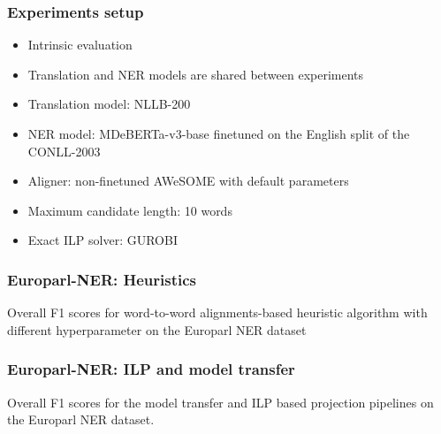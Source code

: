 \documentclass{beamer}
\begin{document}
\begin{frame}
  \frametitle{Experiments setup}

  \begin{itemize}
    \item Intrinsic evaluation
    \item Translation and NER models are shared between experiments
    \item Translation model: NLLB-200
    \item NER model: MDeBERTa-v3-base finetuned on the English split of the CONLL-2003
    \item Aligner: non-finetuned AWeSOME with default parameters
    \item Maximum candidate length: 10 words
    \item Exact ILP solver: GUROBI
  \end{itemize}
\end{frame}

\begin{frame}
  \frametitle{Europarl-NER: Heuristics}

  \begin{table}[ht]
    \centering
    \scalebox{0.75}{
      
    }
    \caption{Overall F1 scores for word-to-word alignments-based heuristic
    algorithm with different hyperparameter  on the Europarl NER dataset}
    \label{tab:europarl_heur_f1}
  \end{table}
\end{frame}

\begin{frame}
  \frametitle{Europarl-NER: ILP and model transfer}

  \begin{table}[t]
    \centering
    \scalebox{0.76}{
      
    }
    \caption{Overall F1 scores for the model transfer and ILP based projection pipelines
    on the Europarl NER dataset.}
    \label{tab:europarl_ilp_f1}
  \end{table}
\end{frame}
\end{document}
